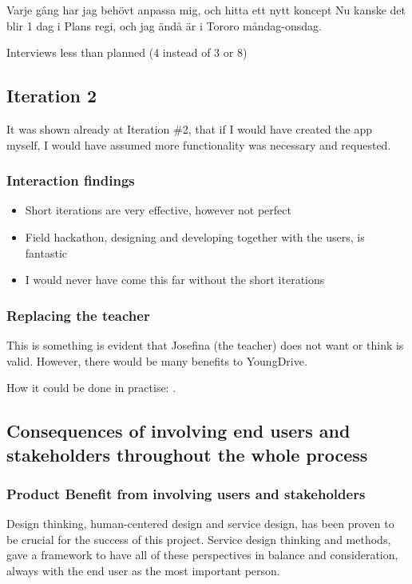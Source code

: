 Varje gång har jag behövt anpassa mig, och hitta ett nytt koncept
Nu kanske det blir 1 dag i Plans regi, och jag ändå är i Tororo måndag-onsdag.

Interviews less than planned (4 instead of 3 or 8)

\subsection{Iteration 2}
It was shown already at Iteration \#2, that if I would have created the app myself, I would have assumed more functionality was necessary and requested.

\subsubsection{Interaction findings}
\begin{itemize}
\item Short iterations are very effective, however not perfect
\item Field hackathon, designing and developing together with the users, is fantastic
\item I would never have come this far without the short iterations
\end{itemize}

\subsubsection{Replacing the teacher}
This is something is evident that Josefina (the teacher) does not want or think is valid. However, there would be many benefits to YoungDrive.

How it could be done in practise: .

\subsection{Consequences of involving end users and stakeholders throughout the whole process}

\subsubsection{Product Benefit from involving users and stakeholders}
Design thinking, human-centered design and service design, has been proven to be crucial for the success of this project. Service design thinking and methods, gave a framework to have all of these perspectives in balance and consideration, always with the end user as the most important person.

